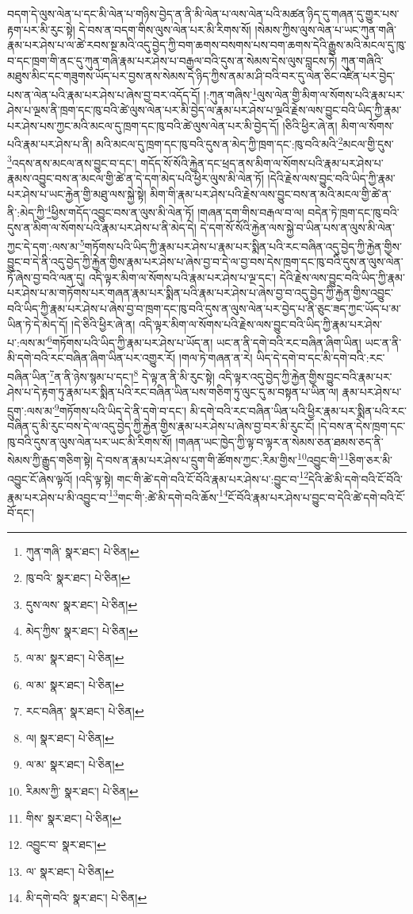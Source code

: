 བདག་དེ་ལུས་ལེན་པ་དང་མི་ལེན་པ་གཉིས་བྱེད་ན་ནི་མི་ལེན་པ་ལས་ལེན་པའི་མཚན་ཉིད་དུ་གཞན་དུ་གྱུར་པས་རྟག་པར་མི་རུང་སྟེ། དེ་བས་ན་བདག་གིས་ལུས་ལེན་པར་མི་རིགས་སོ། །སེམས་ཀྱིས་ལུས་ལེན་པ་ཡང་ཀུན་གཞི་རྣམ་པར་ཤེས་པ་ལ་ཚེ་རབས་སྔ་མའི་འདུ་བྱེད་ཀྱི་བག་ཆགས་བསགས་པས་བག་ཆགས་དེའི་རྒྱུས་མའི་མངལ་དུ་ཁུ་བ་དང་ཁྲག་གི་ནང་དུ་ཀུན་གཞི་རྣམ་པར་ཤེས་པ་བརྒྱལ་བའི་དུས་ན་སེམས་དེས་ལུས་བླངས་ཏེ། ཀུན་གཞིའི་མཐུས་མིང་དང་གཟུགས་ཡོད་པར་བྱས་ནས་སེམས་དེ་ཉིད་ཀྱིས་ནམ་མ་ཤི་བའི་བར་དུ་ལེན་ཅིང་འཛིན་པར་བྱེད་པས་ན་ལེན་པའི་རྣམ་པར་ཤེས་པ་ཞེས་བྱ་བར་འདོད་དོ། །:ཀུན་གཞིས་\footnote{ཀུན་གཞི་  སྣར་ཐང་།  པེ་ཅིན། }ལུས་ལེན་གྱི་མིག་ལ་སོགས་པའི་རྣམ་པར་ཤེས་པ་ལྔས་ནི་ཁྲག་དང་ཁུ་བའི་ཚེ་ལུས་ལེན་པར་མི་བྱེད་ལ་རྣམ་པར་ཤེས་པ་ལྔའི་རྗེས་ལས་བྱུང་བའི་ཡིད་ཀྱི་རྣམ་པར་ཤེས་པས་ཀྱང་མའི་མངལ་དུ་ཁྲག་དང་ཁུ་བའི་ཚེ་ལུས་ལེན་པར་མི་བྱེད་དོ། །ཅིའི་ཕྱིར་ཞེ་ན། མིག་ལ་སོགས་པའི་རྣམ་པར་ཤེས་པ་ནི། མའི་མངལ་དུ་ཁྲག་དང་ཁུ་བའི་དུས་ན་མེད་ཀྱི་ཁྲག་དང་:ཁུ་བའི་མའི་\footnote{ཁུ་བའི་  སྣར་ཐང་།  པེ་ཅིན། }མངལ་གྱི་དུས་\footnote{དུས་ལས་  སྣར་ཐང་།  པེ་ཅིན། }འདས་ནས་མངལ་ནས་བྱུང་བ་དང་། གདོད་སོ་སོའི་རྐྱེན་དང་ཕྲད་ནས་མིག་ལ་སོགས་པའི་རྣམ་པར་ཤེས་པ་རྣམས་འབྱུང་བས་ན་མངལ་གྱི་ཚེ་ན་དེ་དག་མེད་པའི་ཕྱིར་ལུས་མི་ལེན་ཏོ། །དེའི་རྗེས་ལས་བྱུང་བའི་ཡིད་ཀྱི་རྣམ་པར་ཤེས་པ་ཡང་རྐྱེན་གྱི་མཐུ་ལས་སྐྱེ་སྟེ། མིག་གི་རྣམ་པར་ཤེས་པའི་རྗེས་ལས་བྱུང་བས་ན་མའི་མངལ་གྱི་ཚེ་ན་ནི་:མེད་ཀྱི་\footnote{མེད་ཀྱིས་  སྣར་ཐང་།  པེ་ཅིན། }ཕྱིས་གདོད་འབྱུང་བས་ན་ལུས་མི་ལེན་ཏོ། །གཞན་དག་གིས་བརྒལ་བ་ལ། བདེན་ཏེ་ཁྲག་དང་ཁུ་བའི་དུས་ན་མིག་ལ་སོགས་པའི་རྣམ་པར་ཤེས་པ་ནི་མེད་དེ། དེ་དག་སོ་སོའི་རྐྱེན་ལས་སྐྱེ་བ་ཡིན་པས་ན་ལུས་མི་ལེན་ཀྱང་དེ་དག་:ལས་མ་\footnote{ལ་མ་  སྣར་ཐང་།  པེ་ཅིན། }གཏོགས་པའི་ཡིད་ཀྱི་རྣམ་པར་ཤེས་པ་རྣམ་པར་སྨིན་པའི་རང་བཞིན་འདུ་བྱེད་ཀྱི་རྐྱེན་གྱིས་བྱུང་བ་དེ་ནི་འདུ་བྱེད་ཀྱི་རྐྱེན་གྱིས་རྣམ་པར་ཤེས་པ་ཞེས་བྱ་བ་དེ་ལ་བྱ་བས་དེས་ཁྲག་དང་ཁུ་བའི་དུས་ན་ལུས་ལེན་ཏོ་ཞེས་བྱ་བའི་ལན་དུ། འདི་ལྟར་མིག་ལ་སོགས་པའི་རྣམ་པར་ཤེས་པ་ལྔ་དང་། དེའི་རྗེས་ལས་བྱུང་བའི་ཡིད་ཀྱི་རྣམ་པར་ཤེས་པ་མ་གཏོགས་པར་གཞན་རྣམ་པར་སྨིན་པའི་རྣམ་པར་ཤེས་པ་ཞེས་བྱ་བ་འདུ་བྱེད་ཀྱི་རྐྱེན་གྱིས་འབྱུང་བའི་ཡིད་ཀྱི་རྣམ་པར་ཤེས་པ་ཞེས་བྱ་བ་ཁྲག་དང་ཁུ་བའི་དུས་ན་ལུས་ལེན་པར་བྱེད་པ་ནི་ཅུང་ཟད་ཀྱང་ཡོད་པ་མ་ཡིན་ཏེ་དེ་མེད་དོ། །དེ་ཅིའི་ཕྱིར་ཞེ་ན། འདི་ལྟར་མིག་ལ་སོགས་པའི་རྗེས་ལས་བྱུང་བའི་ཡིད་ཀྱི་རྣམ་པར་ཤེས་པ་:ལས་མ་\footnote{ལ་མ་  སྣར་ཐང་།  པེ་ཅིན། }གཏོགས་པའི་ཡིད་ཀྱི་རྣམ་པར་ཤེས་པ་ཡོད་ན། ཡང་ན་ནི་དགེ་བའི་རང་བཞིན་ཞིག་ཡིན། ཡང་ན་ནི་མི་དགེ་བའི་རང་བཞིན་ཞིག་ཡིན་པར་འགྱུར་རོ། །གལ་ཏེ་གཞན་ན་རེ། ཡིད་དེ་དགེ་བ་དང་མི་དགེ་བའི་:རང་བཞིན་ཡིན་\footnote{རང་བཞིན་  སྣར་ཐང་།  པེ་ཅིན། }ན་ནི་ཉེས་སྙམ་པ་དང་།\footnote{ལ།  སྣར་ཐང་།  པེ་ཅིན། } དེ་ལྟ་ན་ནི་མི་རུང་སྟེ། འདི་ལྟར་འདུ་བྱེད་ཀྱི་རྐྱེན་གྱིས་བྱུང་བའི་རྣམ་པར་ཤེས་པ་དེ་རྟག་ཏུ་རྣམ་པར་སྨིན་པའི་རང་བཞིན་ཡིན་པས་གཅིག་ཏུ་ལུང་དུ་མ་བསྟན་པ་ཡིན་ལ། རྣམ་པར་ཤེས་པ་དྲུག་:ལས་མ་\footnote{ལ་མ་  སྣར་ཐང་།  པེ་ཅིན། }གཏོགས་པའི་ཡིད་དེ་ནི་དགེ་བ་དང་། མི་དགེ་བའི་རང་བཞིན་ཡིན་པའི་ཕྱིར་རྣམ་པར་སྨིན་པའི་རང་བཞིན་དུ་མི་རུང་བས་དེ་ལ་འདུ་བྱེད་ཀྱི་རྐྱེན་གྱིས་རྣམ་པར་ཤེས་པ་ཞེས་བྱ་བར་མི་རུང་ངོ། །དེ་བས་ན་དེས་ཁྲག་དང་ཁུ་བའི་དུས་ན་ལུས་ལེན་པར་ཡང་མི་རིགས་སོ། །གཞན་ཡང་ཁྱེད་ཀྱི་ལྟ་བ་ལྟར་ན་སེམས་ཅན་ཐམས་ཅད་ནི་སེམས་ཀྱི་རྒྱུད་གཅིག་སྟེ། དེ་བས་ན་རྣམ་པར་ཤེས་པ་དྲུག་གི་ཚོགས་ཀྱང་:རིམ་གྱིས་\footnote{རིམས་ཀྱི་  སྣར་ཐང་།  པེ་ཅིན། }འབྱུང་གི་\footnote{གིས་  སྣར་ཐང་།  པེ་ཅིན། }ཅིག་ཅར་མི་འབྱུང་ངོ་ཞེས་ལྟའོ། །འདི་ལྟ་སྟེ། གང་གི་ཚེ་དགེ་བའི་ངོ་བོའི་རྣམ་པར་ཤེས་པ་:བྱུང་བ་\footnote{འབྱུང་བ་  སྣར་ཐང་། }དེའི་ཚེ་མི་དགེ་བའི་ངོ་བོའི་རྣམ་པར་ཤེས་པ་མི་འབྱུང་བ་\footnote{ལ་  སྣར་ཐང་།  པེ་ཅིན། }གང་གི་:ཚེ་མི་དགེ་བའི་ཆོས་\footnote{མི་དགེ་བའི་  སྣར་ཐང་།  པེ་ཅིན། }ངོ་བོའི་རྣམ་པར་ཤེས་པ་བྱུང་བ་དེའི་ཚེ་དགེ་བའི་ངོ་བོ་དང་། 